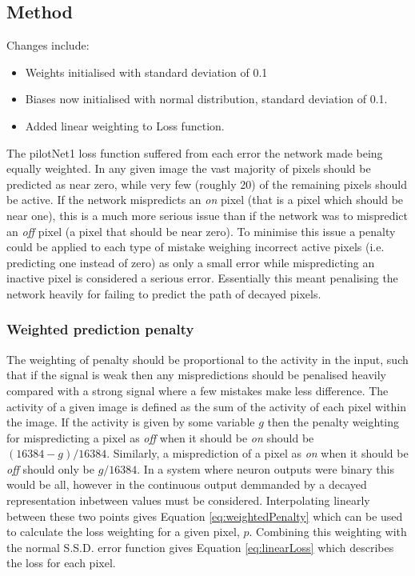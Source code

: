 \subsection{Method}
Changes include:
\begin{itemize}
    \itemsep-0.5em
    \item Weights initialised with standard deviation of 0.1
    \item Biases now initialised with normal distribution, standard deviation of 0.1.
    \item Added linear weighting to Loss function.
\end{itemize}

The pilotNet1 loss function suffered from each error the network made being equally weighted.
In any given image the vast majority of pixels should be predicted as near zero, while very few (roughly 20) of the remaining pixels should be active. 
If the network mispredicts an \textit{on} pixel (that is a pixel which should be near one), this is a much more serious issue than if the network was to mispredict an \textit{off} pixel (a pixel that should be near zero). 
To minimise this issue a penalty could be applied to each type of mistake weighing incorrect active pixels (i.e. predicting one instead of zero) as only a small error while mispredicting an inactive pixel is considered a serious error.
Essentially this meant penalising the network heavily for failing to predict the path of decayed pixels. 

\subsubsection{Weighted prediction penalty}
The weighting of penalty should be proportional to the activity in the input, such that if the signal is weak then any mispredictions should be penalised heavily compared with a strong signal where a few mistakes make less difference. 
The activity of a given image is defined as the sum of the activity of each pixel within the image.
If the activity is given by some variable $g$ then the penalty weighting for mispredicting a pixel as \textit{off} when it should be \textit{on} should be $(16384 - g) / 16384$. 
Similarly, a misprediction of a pixel as \textit{on} when it should be \textit{off} should only be $g / 16384$. 
In a system where neuron outputs were binary this would be all, however in the continuous output demmanded by a decayed representation inbetween values must be considered.
Interpolating linearly between these two points gives Equation \ref{eq:weightedPenalty} which can be used to calculate the loss weighting for a given pixel, $p$.
Combining this weighting with the normal S.S.D. error function gives Equation \ref{eq:linearLoss} which describes the loss for each pixel. 

